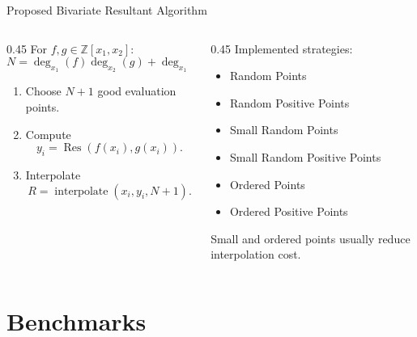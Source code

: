 \documentclass[aspectratio=169]{beamer}
\newcommand{\Res}{\operatorname{Res}}
\newcommand{\Z}{\mathbb{Z}}
\begin{document}
\begin{frame}{Proposed Bivariate Resultant Algorithm}
\begin{columns}
  \begin{column}{0.45 \textwidth}
    For $f,g\in\Z[x_1,x_2]$:
    \[
      N=\deg_{x_1}(f)\deg_{x_2}(g)
      +
      \deg_{x_1}(g)\deg_{x_2}(f).
    \]

    \begin{enumerate}
      \item Choose $N+1$ good evaluation points.
      \item Compute
      \[
        y_i=\Res(f(x_i),g(x_i)).
      \]
      \item Interpolate
      \[
        R=\operatorname{interpolate}(x_i,y_i,N+1).
      \]
    \end{enumerate}
  \end{column}
  \pause
  \begin{column}{0.45 \textwidth}
    Implemented strategies:
    \begin{itemize}
      \item Random Points
      \item Random Positive Points
      \item Small Random Points
      \item Small Random Positive Points
      \item Ordered Points
      \item Ordered Positive Points
    \end{itemize}

    \vspace{0.5em}
    Small and ordered points usually reduce interpolation cost.
  \end{column}
\end{columns}
\end{frame}

\section{Benchmarks}
\end{document}
